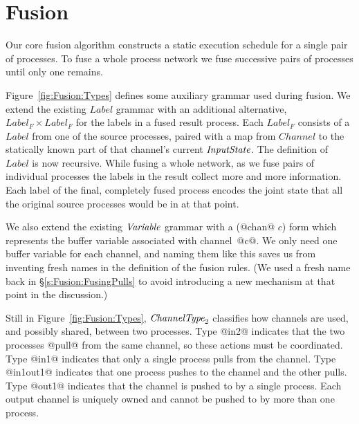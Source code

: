 
\section{Fusion}
\label{s:Fusion}

Our core fusion algorithm constructs a static execution schedule for a single pair of processes. To fuse a whole process network we fuse successive pairs of processes until only one remains. 

Figure~\ref{fig:Fusion:Types} defines some auxiliary grammar used during fusion. We extend the existing $Label$ grammar with an additional alternative, $Label_F \times Label_F$ for the labels in a fused result process. Each $Label_F$ consists of a $Label$ from one of the source processes, paired with a map from $Channel$ to the statically known part of that channel's current $\textit{InputState}$. The definition of $Label$ is now recursive. While fusing a whole network, as we fuse pairs of individual processes the labels in the result collect more and more information. Each label of the final, completely fused process encodes the joint state that all the original source processes would be in at that point.



We also extend the existing $\textit{Variable}$ grammar with a (@chan@ $c$) form which represents the buffer variable associated with \mbox{channel @c@}. We only need one buffer variable for each channel, and naming them like this saves us from inventing fresh names in the definition of the fusion rules.
(We used a fresh name back in \S\ref{s:Fusion:FusingPulls} to avoid introducing a new mechanism at that point in the discussion.) 

Still in Figure~\ref{fig:Fusion:Types}, $\textit{ChannelType}_2$ classifies how channels are used, and possibly shared, between two processes. Type @in2@ indicates that the two processes @pull@ from the same channel, so these actions must be coordinated. Type @in1@ indicates that only a single process pulls from the channel. Type @in1out1@ indicates that one process pushes to the channel and the other pulls. Type @out1@ indicates that the channel is pushed to by a single process. Each output channel is uniquely owned and cannot be pushed to by more than one process.

